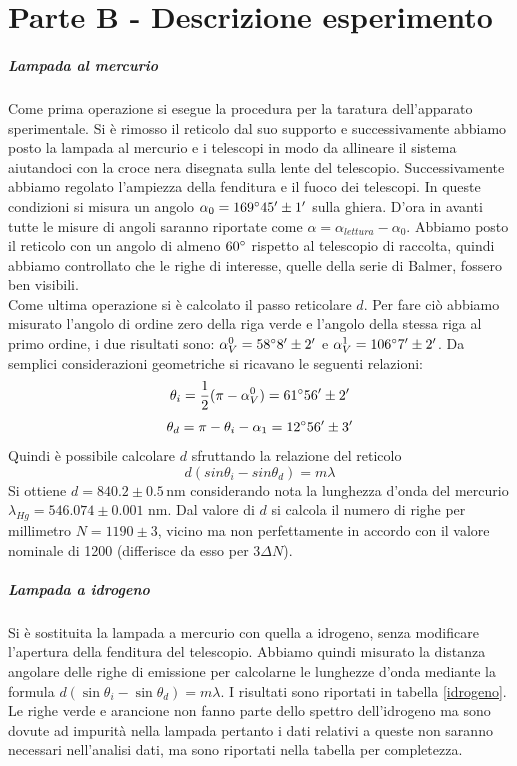 \documentclass[10pt,a4paper]{article}
\begin{document}
\section{Parte B - Descrizione esperimento}
\subparagraph{Lampada al mercurio}
Come prima operazione si esegue la procedura per la taratura dell'apparato sperimentale. Si è rimosso il reticolo dal suo supporto e successivamente abbiamo posto la lampada al mercurio e i telescopi in modo da allineare il sistema aiutandoci con la croce nera disegnata sulla lente del telescopio. Successivamente abbiamo regolato l'ampiezza della fenditura e il fuoco dei telescopi. In queste condizioni si misura un angolo $\alpha_0 = 169 \degree 45 '\pm 1'$ sulla ghiera. D'ora in avanti tutte le misure di angoli saranno riportate come $\alpha=\alpha_{lettura}-\alpha_0$. Abbiamo posto il reticolo con un angolo di almeno $60\degree$ rispetto al telescopio di raccolta, quindi abbiamo controllato che le righe di interesse, quelle della serie di Balmer, fossero ben visibili.\\
Come ultima operazione si è calcolato il passo reticolare $d$. Per fare ciò abbiamo misurato l'angolo di ordine zero della riga verde e l'angolo della stessa riga al primo ordine, i due risultati sono: $\alpha_V^{0} = 58 \degree 8 ' \pm 2'$ e $\alpha_V^{1} = 106 \degree 7' \pm 2'$. Da semplici considerazioni geometriche si ricavano le seguenti relazioni:
\begin{equation}
\theta_i=\frac{1}{2}(\pi-\alpha_V^{0})=61\degree 56'\pm2'
\end{equation}
\begin{equation}
\theta_d=\pi-\theta_i-\alpha_1= 12 \degree 56' \pm 3'
\end{equation}
Quindi è possibile calcolare $d$ sfruttando la relazione del reticolo 
\begin{equation}
d(sin{\theta_i}-sin{\theta_d})=m\lambda
\end{equation}
Si ottiene $d = 840.2 \pm 0.5 \,\mbox{nm}$ considerando nota la lunghezza d'onda del mercurio $\lambda_{Hg}=546.074\pm0.001\,\,\mbox{nm}$. Dal valore di $d$ si calcola il numero di righe per millimetro $N = 1190 \pm 3$, vicino ma non perfettamente in accordo con il valore nominale di 1200 (differisce da esso per $3 \Delta N$).

\subparagraph{Lampada a idrogeno}
Si è sostituita la lampada a mercurio con quella a idrogeno, senza modificare l'apertura della fenditura del telescopio. Abbiamo quindi misurato la distanza angolare delle righe di emissione per calcolarne le lunghezze d'onda mediante la formula $d(\sin{\theta_i}-\sin{\theta_d})=m\lambda$. I risultati sono riportati in tabella \ref{idrogeno}. Le righe verde e arancione non fanno parte dello spettro dell'idrogeno ma sono dovute ad impurità nella lampada pertanto i dati relativi a queste non saranno necessari nell'analisi dati, ma sono riportati nella tabella per completezza.\\
\end{document}
